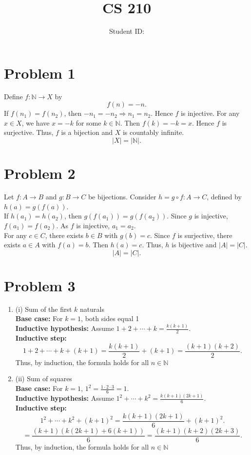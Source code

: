 \documentclass[twoside]{article}
\title{CS 210 \hwNo}
\author{\myname \qquad Student ID:\myid}
\date{}
\begin{document}
\maketitle

\section*{Problem 1}
Define \( f:\mathbb{N} \to X \) by \[f(n) = -n.\]
If \( f(n_1) = f(n_2) \), then \(-n_1 = -n_2 \Rightarrow n_1 = n_2\). Hence \(f\) is injective.
For any \(x \in X\), we have \(x = -k\) for some \(k \in \mathbb{N}\). Then \(f(k) = -k = x\). Hence \(f\) is surjective.
Thus, \(f\) is a bijection and \(X\) is countably infinite.
\[\boxed{|X| = |\mathbb{N}|.}\]

\section*{Problem 2}
Let \(f:A\to B\) and \(g:B\to C\) be bijections. Consider \(h=g\circ f:A\to C\), defined by \(h(a)=g(f(a))\). \\
If \(h(a_1)=h(a_2)\), then \(g(f(a_1))=g(f(a_2))\). Since \(g\) is injective, \(f(a_1)=f(a_2)\). As \(f\) is injective, \(a_1=a_2\). \\
For any \(c\in C\), there exists \(b\in B\) with \(g(b)=c\). Since \(f\) is surjective, there exists \(a\in A\) with \(f(a)=b\). Then \(h(a)=c\).
Thus, \(h\) is bijective and \(|A|=|C|\).
\[\boxed{|A|=|C|.}\]

\section*{Problem 3}

\begin{enumerate}
    \item(i)    Sum of the first \(k\) naturals \\
                \textbf{Base case:} For \(k=1\), both sides equal 1 \\
                \textbf{Inductive hypothesis:} Assume \(1+2+\cdots+k = \tfrac{k(k+1)}{2}\). \\
                \textbf{Inductive step:} \[1+2+\cdots+k+(k+1)=\frac{k(k+1)}{2}+(k+1)=\frac{(k+1)(k+2)}{2}.\]
                Thus, by induction, the formula holds for all \(n\in\mathbb{N}\)
    \item(ii)   Sum of squares \\
                \textbf{Base case:} For \(k=1\), \(1^2=\tfrac{1\cdot2\cdot3}{6}=1\). \\
                \textbf{Inductive hypothesis:} Assume \(1^2+\cdots+k^2=\tfrac{k(k+1)(2k+1)}{6}\). \\
                \textbf{Inductive step:} \[1^2+\cdots+k^2+(k+1)^2=\frac{k(k+1)(2k+1)}{6}+(k+1)^2.\]
                \[=\frac{(k+1)(k(2k+1)+6(k+1))}{6}=\frac{(k+1)(k+2)(2k+3)}{6}.\]
                Thus, by induction, the formula holds for all \(n\in\mathbb{N}\)
\end{enumerate}
\end{document}
